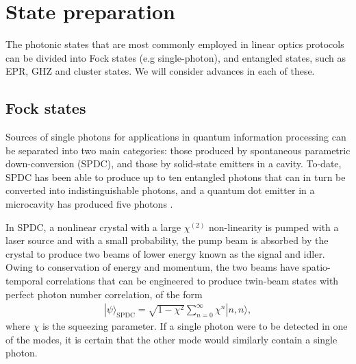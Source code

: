 \documentclass[times,final]{elsarticle}
\newcommand{\ket}[1]{|#1\rangle}
\newcommand{\sihui}[1]{{\color{Orchid}{#1}}}
\begin{document}
\section{State preparation}\label{sec:state}

The photonic states that are most commonly employed in linear optics protocols can be divided into Fock states (e.g single-photon), and entangled states, such as EPR, GHZ and cluster states. We will consider advances in each of these. \sihui{Quantum state engineering using quantum interferometers has also attracted some interest, and is discussed at the end of this section.}

\subsection{Fock states}\label{sec:singlephotons}

Sources of single photons for applications in quantum information processing can be separated into two main categories: those produced by spontaneous parametric down-conversion (SPDC), and those by solid-state emitters in a cavity. To-date, SPDC has been able to produce up to ten entangled photons \cite{bib:WangChen16,bib:Chen17} that can in turn be converted into indistinguishable photons, and a quantum dot emitter in a microcavity has produced five photons \cite{bib:WangHe16}.

In SPDC, a nonlinear crystal with a large $\chi^{(2)}$ non-linearity is pumped with a laser source and with a small probability, the pump beam is absorbed by the crystal to produce two beams of lower energy known as the signal and idler. Owing to conservation of energy and momentum, the two beams have spatio-temporal correlations that can be engineered to produce twin-beam states with perfect  photon number correlation, of the form
\begin{align}
\ket\psi_\mathrm{SPDC} = \sqrt{1-\chi^2} \sum_{n=0}^\infty \chi^n \ket{n,n},	
\end{align}
where $\chi$ is the squeezing parameter. If a single photon were to be detected in one of the modes, it is certain that the other mode would similarly contain a single photon.

\end{document}
